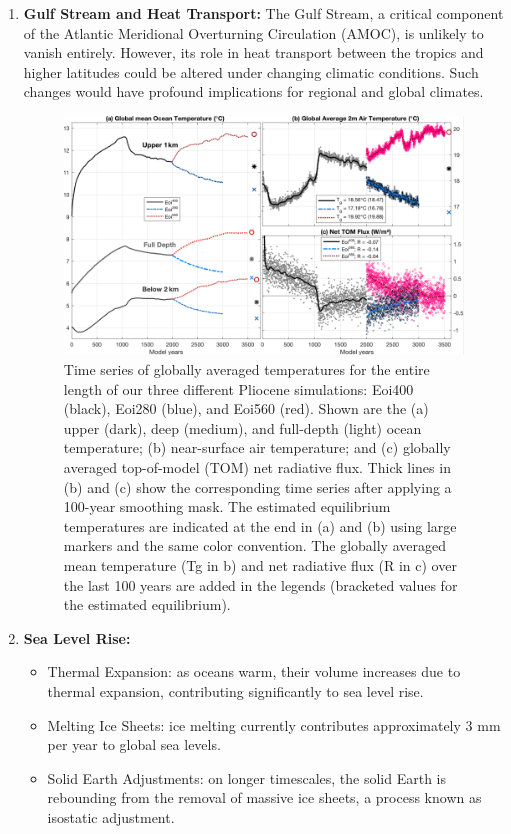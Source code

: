 \begin{enumerate}
	\item \textbf{Gulf Stream and Heat Transport:} The Gulf Stream, a critical component of the Atlantic Meridional Overturning Circulation (AMOC), is unlikely to vanish entirely. However, its role in heat transport between the tropics and higher latitudes could be altered under changing climatic conditions. Such changes would have profound implications for regional and global climates.
	      \begin{figure}[htpb]
		      \centering
		      \includegraphics[width=0.5\linewidth]{upload/temperature.png}
		      \caption{Time series of globally averaged temperatures for the entire length of our three different Pliocene simulations: Eoi400 (black), Eoi280 (blue), and Eoi560 (red). Shown are the (a) upper (dark), deep (medium), and full-depth (light) ocean temperature; (b) near-surface air temperature; and (c) globally averaged top-of-model (TOM) net radiative flux. Thick lines in (b) and (c) show the corresponding time series after applying a 100-year smoothing mask. The estimated equilibrium temperatures are indicated at the end in (a) and (b) using large markers and the same color convention. The globally averaged mean temperature (Tg in b) and net radiative flux (R in c) over the last 100 years are added in the legends (bracketed values for the estimated equilibrium). }
		      \label{fig:temperature}
	      \end{figure}
	\item \textbf{Sea Level Rise:}
	      \begin{itemize}
		      \item Thermal Expansion: as oceans warm, their volume increases due to thermal expansion, contributing significantly to sea level rise.
		      \item Melting Ice Sheets: ice melting currently contributes approximately 3 mm per year to global sea levels.
		      \item Solid Earth Adjustments: on longer timescales, the solid Earth is rebounding from the removal of massive ice sheets, a process known as isostatic adjustment.

\end{itemize}
\end{enumerate}
